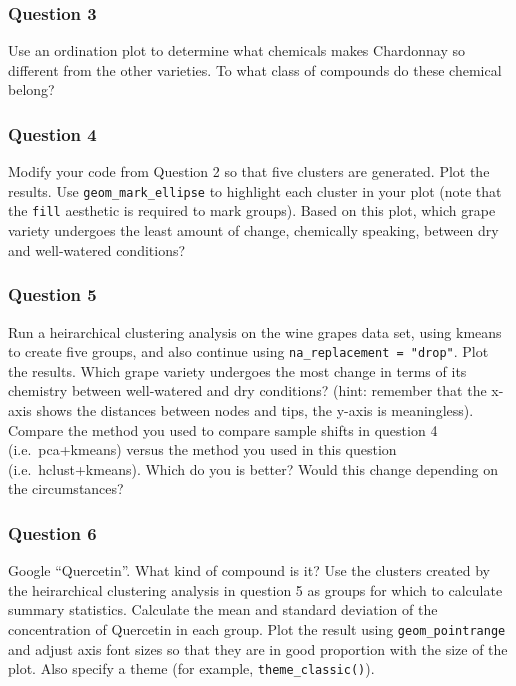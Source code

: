 \documentclass[
]{krantz}
\begin{document}
\hypertarget{question-3}{%
\subsubsection{Question 3}\label{question-3}}

Use an ordination plot to determine what chemicals makes Chardonnay so different from the other varieties. To what class of compounds do these chemical belong?

\hypertarget{question-4}{%
\subsubsection{Question 4}\label{question-4}}

Modify your code from Question 2 so that five clusters are generated. Plot the results. Use \texttt{geom\_mark\_ellipse} to highlight each cluster in your plot (note that the \texttt{fill} aesthetic is required to mark groups). Based on this plot, which grape variety undergoes the least amount of change, chemically speaking, between dry and well-watered conditions?

\hypertarget{question-5}{%
\subsubsection{Question 5}\label{question-5}}

Run a heirarchical clustering analysis on the wine grapes data set, using kmeans to create five groups, and also continue using \texttt{na\_replacement\ =\ "drop"}. Plot the results. Which grape variety undergoes the most change in terms of its chemistry between well-watered and dry conditions? (hint: remember that the x-axis shows the distances between nodes and tips, the y-axis is meaningless). Compare the method you used to compare sample shifts in question 4 (i.e.~pca+kmeans) versus the method you used in this question (i.e.~hclust+kmeans). Which do you is better? Would this change depending on the circumstances?

\hypertarget{question-6}{%
\subsubsection{Question 6}\label{question-6}}

Google ``Quercetin''. What kind of compound is it? Use the clusters created by the heirarchical clustering analysis in question 5 as groups for which to calculate summary statistics. Calculate the mean and standard deviation of the concentration of Quercetin in each group. Plot the result using \texttt{geom\_pointrange} and adjust axis font sizes so that they are in good proportion with the size of the plot. Also specify a theme (for example, \texttt{theme\_classic()}).
\end{document}
